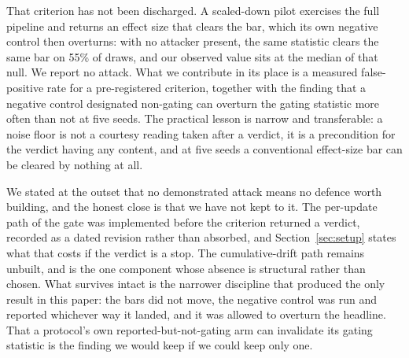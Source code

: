 \documentclass[journal]{IEEEtran}
\begin{document}
That criterion has not been discharged. A scaled-down pilot exercises the full
pipeline and returns an effect size that clears the bar, which its own negative
control then overturns: with no attacker present, the same statistic clears the
same bar on 55\% of draws, and our observed value sits at the median of that
null. We report no attack. What we contribute in its place is a measured
false-positive rate for a pre-registered criterion, together with the finding
that a negative control designated non-gating can overturn the gating statistic
more often than not at five seeds. The practical lesson is narrow and
transferable: a noise floor is not a courtesy reading taken after a verdict, it is
a precondition for the verdict having any content, and at five seeds a
conventional effect-size bar can be cleared by nothing at all.

We stated at the outset that no demonstrated attack means no defence worth
building, and the honest close is that we have not kept to it. The per-update path
of the gate was implemented before the criterion returned a verdict, recorded as a
dated revision rather than absorbed, and Section~\ref{sec:setup} states what that
costs if the verdict is a stop. The cumulative-drift path remains unbuilt, and is
the one component whose absence is structural rather than chosen. What survives
intact is the narrower discipline that produced the only result in this paper: the
bars did not move, the negative control was run and reported whichever way it
landed, and it was allowed to overturn the headline. That a protocol's own
reported-but-not-gating arm can invalidate its gating statistic is the finding we
would keep if we could keep only one.
\end{document}
